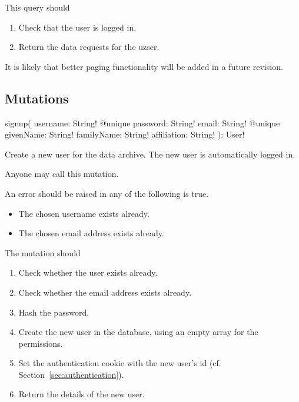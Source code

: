 \functionality

This query should

\begin{enumerate}
    \item Check that the user is logged in.
    \item Return the data requests for the uzser.
\end{enumerate}

\begin{note}
It is likely that better paging functionality will be added in a future revision.
\end{note}

\subsection{Mutations}


\begin{code}
signup(
  username: String! @unique
  password: String!
  email: String! @unique
  givenName: String!
  familyName: String!
  affiliation: String!
): User!
\end{code}

Create a new user for the data archive. The new user is automatically logged in.

\restrictions

Anyone may call this mutation.

\errors

An error should be raised in any of the following is true.

\begin{itemize}
    \item The chosen username exists already.
    \item The chosen email address exists already.
\end{itemize}

\functionality

The mutation should

\begin{enumerate}
    \item Check whether the user exists already.
    \item Check whether the email address exists already.
    \item Hash the password.
    \item Create the new user in the database, using an empty array for the permissions.
    \item Set the authentication cookie with the new user's id (cf. Section~\ref{sec:authentication}).
    \item Return the details of the new user.
\end{enumerate}

